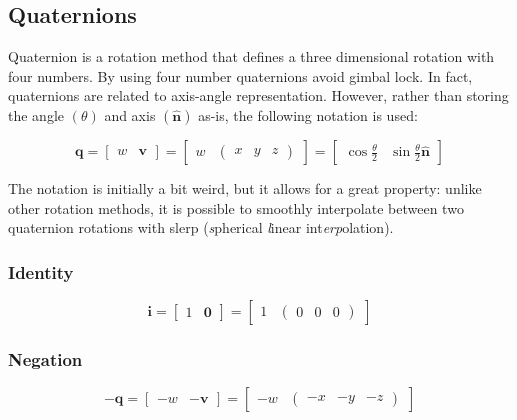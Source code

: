 \subsection{Quaternions}

Quaternion is a rotation method that defines a three dimensional rotation with four numbers. By using four number quaternions avoid gimbal lock. In fact, quaternions are related to axis-angle representation. However, rather than storing the angle $(\theta)$ and axis $(\hat{\textbf{n}})$ as-is, the following notation is used:

$$
\textbf{q}=\begin{bmatrix}
	w & \textbf{v}
\end{bmatrix}=\begin{bmatrix}
	w & \begin{pmatrix}
		x & y & z
	\end{pmatrix}
\end{bmatrix}=\begin{bmatrix}
	\cos\frac{\theta}{2} & \sin\frac{\theta}{2}\hat{\textbf{n}}
\end{bmatrix}
$$

The notation is initially a bit weird, but it allows for a great property: unlike other rotation methods, it is possible to smoothly interpolate between two quaternion rotations with slerp (\textit{s}pherical \textit{l}inear int\textit{erp}olation). 

\subsubsection{Identity}

$$
\textbf{i}=\begin{bmatrix}
	1 & \textbf{0}
\end{bmatrix}=\begin{bmatrix}
	1 & \begin{pmatrix}
		0 & 0 & 0
	\end{pmatrix}
\end{bmatrix}
$$

\subsubsection{Negation}

$$-\textbf{q}=\begin{bmatrix}
	-w & -\textbf{v}
\end{bmatrix}=\begin{bmatrix}
	-w & \begin{pmatrix}
		-x & -y & -z
	\end{pmatrix}
\end{bmatrix}$$

